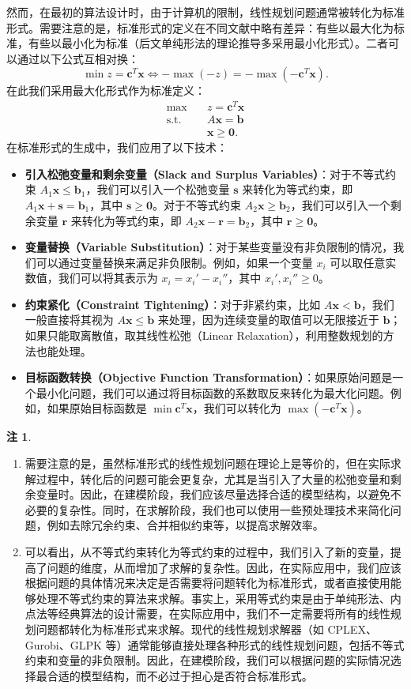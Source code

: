 \documentclass[12pt]{article}
\theoremstyle{plain}
\theoremstyle{definition}
\newtheorem{rmk}{注}[subsection]
\newcommand{\st}{\mathrel{\text{s.t.}}}
\begin{document}
然而，在最初的算法设计时，由于计算机的限制，线性规划问题通常被转化为标准形式。需要注意的是，标准形式的定义在不同文献中略有差异：有些以最大化为标准，有些以最小化为标准（后文单纯形法的理论推导多采用最小化形式）。二者可以通过以下公式互相对换：
\[ \min z = \bm{c}^T \bm{x} \iff -\max(-z) = -\max(-\bm{c}^T \bm{x}). \]
在此我们采用最大化形式作为标准定义：
\begin{align*}
    \max \quad & z = \bm{c}^T \bm{x} \\
    \st \quad & A\bm{x} = \bm{b} \\
    & \bm{x} \geq \bm{0}.
\end{align*}
在标准形式的生成中，我们应用了以下技术：
\begin{itemize}
    \item \textbf{引入松弛变量和剩余变量（Slack and Surplus Variables）}：对于不等式约束 $A_1\bm{x} \leq \bm{b}_1$，我们可以引入一个松弛变量 $\bm{s}$ 来转化为等式约束，即 $A_1\bm{x} + \bm{s} = \bm{b}_1$，其中 $\bm{s} \geq \bm{0}$。对于不等式约束 $A_2\bm{x} \geq \bm{b}_2$，我们可以引入一个剩余变量 $\bm{r}$ 来转化为等式约束，即 $A_2\bm{x} - \bm{r} = \bm{b}_2$，其中 $\bm{r} \geq \bm{0}$。
    \item \textbf{变量替换（Variable Substitution）}：对于某些变量没有非负限制的情况，我们可以通过变量替换来满足非负限制。例如，如果一个变量 $x_i$ 可以取任意实数值，我们可以将其表示为 $x_i = x_i' - x_i''$，其中 $x_i', x_i'' \geq 0$。
    \item \textbf{约束紧化（Constraint Tightening）}：对于非紧约束，比如 $A\bm{x} < \bm{b}$，我们一般直接将其视为 $A\bm{x} \leq \bm{b}$ 来处理，因为连续变量的取值可以无限接近于 $\bm{b}$；如果只能取离散值，取其线性松弛（Linear Relaxation），利用整数规划的方法也能处理。 
    \item \textbf{目标函数转换（Objective Function Transformation）}：如果原始问题是一个最小化问题，我们可以通过将目标函数的系数取反来转化为最大化问题。例如，如果原始目标函数是 $\min \bm{c}^T \bm{x}$，我们可以转化为 $\max (-\bm{c}^T \bm{x})$。
\end{itemize}
\begin{rmk}
\begin{enumerate}
    \item 需要注意的是，虽然标准形式的线性规划问题在理论上是等价的，但在实际求解过程中，转化后的问题可能会更复杂，尤其是当引入了大量的松弛变量和剩余变量时。因此，在建模阶段，我们应该尽量选择合适的模型结构，以避免不必要的复杂性。同时，在求解阶段，我们也可以使用一些预处理技术来简化问题，例如去除冗余约束、合并相似约束等，以提高求解效率。
    \item 可以看出，从不等式约束转化为等式约束的过程中，我们引入了新的变量，提高了问题的维度，从而增加了求解的复杂性。因此，在实际应用中，我们应该根据问题的具体情况来决定是否需要将问题转化为标准形式，或者直接使用能够处理不等式约束的算法来求解。事实上，采用等式约束是由于单纯形法、内点法等经典算法的设计需要，在实际应用中，我们不一定需要将所有的线性规划问题都转化为标准形式来求解。现代的线性规划求解器（如 CPLEX、Gurobi、GLPK 等）通常能够直接处理各种形式的线性规划问题，包括不等式约束和变量的非负限制。因此，在建模阶段，我们可以根据问题的实际情况选择最合适的模型结构，而不必过于担心是否符合标准形式。
\end{enumerate}
\end{rmk}
\end{document}
